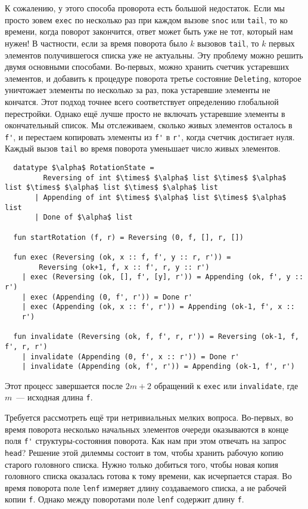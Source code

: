 К сожалению, у этого способа проворота есть большой недостаток. Если
мы просто зовем \lstinline!exec! по несколько раз
при каждом вызове \lstinline!snoc! или \lstinline!tail!, то ко
времени, когда поворот закончится, ответ может быть уже не тот,
который нам нужен! В частности, если за время поворота было $k$
вызовов \lstinline!tail!, то $k$ первых элементов получившегося списка
уже не актуальны. Эту проблему можно решить двумя основными
способами. Во-первых, можно хранить счетчик устаревших элементов, и
добавить к процедуре поворота третье состояние \lstinline!Deleting!,
которое уничтожает элементы по несколько за раз, пока устаревшие
элементы не кончатся. Этот подход точнее всего соответствует
определению глобальной перестройки. Однако ещё лучше просто не
включать устаревшие элементы в окончательный список. Мы отслеживаем,
сколько живых элементов осталось в \lstinline!f'!, и перестаем
копировать элементы из \lstinline!f'! в \lstinline!r'!, когда счетчик
достигает нуля. Каждый вызов \lstinline!tail! во время поворота
уменьшает число живых элементов.
\begin{lstlisting}
  datatype $\alpha$ RotationState =
         Reversing of int $\times$ $\alpha$ list $\times$ $\alpha$ list $\times$ $\alpha$ list $\times$ $\alpha$ list
       | Appending of int $\times$ $\alpha$ list $\times$ $\alpha$ list
       | Done of $\alpha$ list

  fun startRotation (f, r) = Reversing (0, f, [], r, [])
  
  fun exec (Reversing (ok, x :: f, f', y :: r, r')) =
        Reversing (ok+1, f, x :: f', r, y :: r')
    | exec (Reversing (ok, [], f', [y], r')) = Appending (ok, f', y :: r')
    | exec (Appending (0, f', r')) = Done r'
    | exec (Appending (ok, x :: f', r')) = Appending (ok-1, f', x ::
    r')

  fun invalidate (Reversing (ok, f, f', r, r')) = Reversing (ok-1, f, f', r, r')
    | invalidate (Appending (0, f', x :: r')) = Done r'
    | invalidate (Appending (ok, f', r')) = Appending (ok-1, f', r')
\end{lstlisting}
Этот процесс завершается после $2m + 2$ обращений к \lstinline!exec! или
\lstinline!invalidate!, где $m$~--- исходная длина \lstinline!f!.

Требуется рассмотреть ещё три нетривиальных мелких вопроса. Во-первых,
во время поворота несколько начальных элементов очереди оказываются в
конце поля \lstinline!f'! структуры-состояния поворота. Как нам при
этом отвечать на запрос \lstinline!head!? Решение этой дилеммы состоит
в том, чтобы хранить рабочую копию старого головного списка. Нужно
только добиться того, чтобы новая копия головного списка оказалась
готова к тому времени, как исчерпается старая. Во время поворота поле
\lstinline!lenf! измеряет длину создаваемого списка, а не рабочей
копии \lstinline!f!. Однако между поворотами поле \lstinline!lenf!
содержит длину \lstinline!f!.

